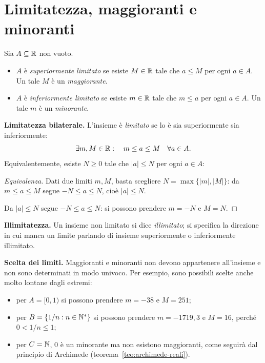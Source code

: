 \section{Limitatezza, maggioranti e minoranti}

\begin{definizione}
Sia $A\subseteq\mathbb{R}$ non vuoto.
\begin{itemize}
  \item $A$ è \emph{superiormente limitato} se esiste $M\in\mathbb{R}$ tale che $a\le M$ per ogni $a\in A$. Un tale $M$ è un \emph{maggiorante}.
  \item $A$ è \emph{inferiormente limitato} se esiste $m\in\mathbb{R}$ tale che $m\le a$ per ogni $a\in A$. Un tale $m$ è un \emph{minorante}.
\end{itemize}
\end{definizione}

\textbf{Limitatezza bilaterale.} L'insieme è \emph{limitato} se lo è sia superiormente sia inferiormente:
\[
  \exists m,M\in\mathbb{R}:\quad m\le a\le M\quad\forall a\in A.
\]
Equivalentemente, esiste $N\ge0$ tale che $|a|\le N$ per ogni $a\in A$:

\begin{proof}[Equivalenza]
\passomath{\Rightarrow} Dati due limiti $m,M$, basta scegliere $N=\max\{|m|,|M|\}$: da $m\le a\le M$ segue $-N\le a\le N$, cioè $|a|\le N$.

\passomath{\Leftarrow} Da $|a|\le N$ segue $-N\le a\le N$: si possono prendere $m=-N$ e $M=N$.
\end{proof}

\textbf{Illimitatezza.} Un insieme non limitato si dice \emph{illimitato}; si specifica la direzione in cui manca un limite parlando di insieme superiormente o inferiormente illimitato.

\textbf{Scelta dei limiti.} Maggioranti e minoranti non devono appartenere all'insieme e non sono determinati in modo univoco. Per esempio, sono possibili scelte anche molto lontane dagli estremi:
\begin{itemize}
  \item per $A=[0,1)$ si possono prendere $m=-38$ e $M=251$;
  \item per $B=\{1/n:n\in\mathbb{N}^*\}$ si possono prendere $m=-1719{,}3$ e $M=16$, perché $0<1/n\le1$;
  \item per $C=\mathbb{N}$, $0$ è un minorante ma non esistono maggioranti, come seguirà dal principio di Archimede (teorema~\ref{teo:archimede-reali}).
\end{itemize}

